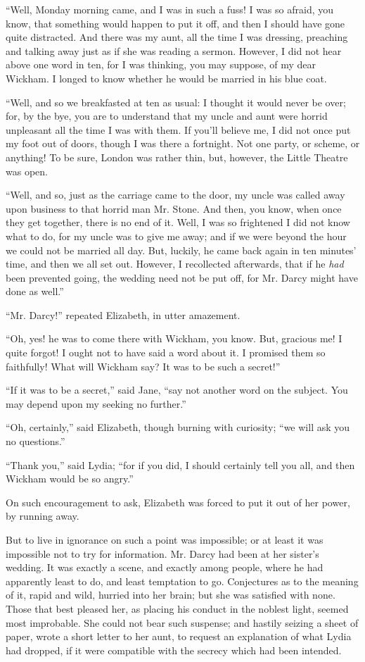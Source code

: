 ``Well, Monday morning came, and I was in such a fuss! I was so afraid, you know, that something would happen to put it off, and then I should have gone quite distracted. And there was my aunt, all the time I was dressing, preaching and talking away just as if she was reading a sermon. However, I did not hear above one word in ten, for I was thinking, you may suppose, of my dear Wickham. I longed to know whether he would be married in his blue coat.

``Well, and so we breakfasted at ten as usual: I thought it would never be over; for, by the bye, you are to understand that my uncle and aunt were horrid unpleasant all the time I was with them. If you'll believe me, I did not once put my foot out of doors, though I was there a fortnight. Not one party, or scheme, or anything! To be sure, London was rather thin, but, however, the Little Theatre was open.

``Well, and so, just as the carriage came to the door, my uncle was called away upon business to that horrid man Mr. Stone. And then, you know, when once they get together, there is no end of it. Well, I was so frightened I did not know what to do, for my uncle was to give me away; and if we were beyond the hour we could not be married all day. But, luckily, he came back again in ten minutes' time, and then we all set out. However, I recollected afterwards, that if he \textit{had} been prevented going, the wedding need not be put off, for Mr. Darcy might have done as well.''

``Mr. Darcy!'' repeated Elizabeth, in utter amazement.

``Oh, yes! he was to come there with Wickham, you know. But, gracious me! I quite forgot! I ought not to have said a word about it. I promised them so faithfully! What will Wickham say? It was to be such a secret!''

``If it was to be a secret,'' said Jane, ``say not another word on the subject. You may depend upon my seeking no further.''

``Oh, certainly,'' said Elizabeth, though burning with curiosity; ``we will ask you no questions.''

``Thank you,'' said Lydia; ``for if you did, I should certainly tell you all, and then Wickham would be so angry.''

On such encouragement to ask, Elizabeth was forced to put it out of her power, by running away.

But to live in ignorance on such a point was impossible; or at least it was impossible not to try for information. Mr. Darcy had been at her sister's wedding. It was exactly a scene, and exactly among people, where he had apparently least to do, and least temptation to go. Conjectures as to the meaning of it, rapid and wild, hurried into her brain; but she was satisfied with none. Those that best pleased her, as placing his conduct in the noblest light, seemed most improbable. She could not bear such suspense; and hastily seizing a sheet of paper, wrote a short letter to her aunt, to request an explanation of what Lydia had dropped, if it were compatible with the secrecy which had been intended.

